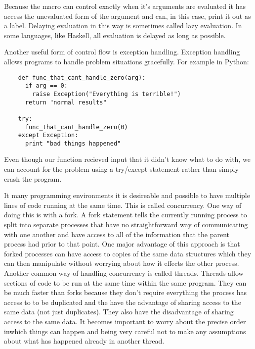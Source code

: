 \documentclass[11pt]{article}
\begin{document}
   
   Because the macro can control exactly when it's arguments are
   evaluated it has access the unevaluated form of the argument and
   can, in this case, print it out as a label.  Delaying evaluation in
   this way is sometimes called lazy evaluation.  In some languages,
   like Haskell, all evaluation is delayed as long as possible.
   
   Another useful form of control flow is exception handling.
   Exception handling allows programs to handle problem situations
   gracefully.  For example in Python:
   
\begin{verbatim}
    def func_that_cant_handle_zero(arg):
      if arg == 0:
        raise Exception("Everything is terrible!")
      return "normal results"
    
    try:
      func_that_cant_handle_zero(0)
    except Exception:
      print "bad things happened"
\end{verbatim}

   
   Even though our function recieved input that it didn't know what to
   do with, we can account for the problem using a try/except
   statement rather than simply crash the program.  
   
   It many programming environments it is desireable and possible to
   have multiple lines of code running at the same time.  This is
   called concurrency.  One way of doing this is with a fork.  A fork
   statement tells the currently running process to split into
   separate processes that have no straightforward way of
   communicating with one another and have access to all of the
   information that the parent process had prior to that point.  One
   major advantage of this approach is that forked processes can have
   access to copies of the same data structures which they can then
   manipulate without worrying about how it effects the other
   process.  Another common way of handling concurrency is called
   threads.  Threads allow sections of code to be run at the same time
   within the same program.  They can be much faster than forks
   because they don't require everything the process has access to to
   be duplicated and the have the advantage of sharing access to the
   same data (not just duplicates).  They also have the disadvantage
   of sharing access to the same data.  It becomes important to worry
   about the precise order inwhich things can happen and being very
   careful not to make any assumptions about what has happened already
   in another thread.
   
\end{document}
